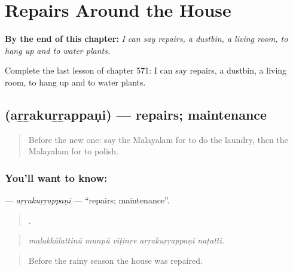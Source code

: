 
\chapter{Repairs Around the House}
\label{ch:ml-repairs-around-the-house}

\begin{chapteropening}
\textbf{By the end of this chapter:} \emph{I can say repairs, a dustbin, a living room, to hang up and to water plants.}

Complete the last lesson of chapter 571: I can say repairs, a dustbin, a living room, to hang up and to water plants.
\end{chapteropening}

\section[\texorpdfstring{\ml{അറ്റകുറ്റപ്പണി} (aṟṟakuṟṟappaṇi)}{അറ്റകുറ്റപ്പണി (aṟṟakuṟṟappaṇi)}]{ (aṟṟakuṟṟappaṇi) — repairs; maintenance}

\label{lesson:ML-C571-arrakurrappani}



\begin{quote}
Before the new one: say the Malayalam for to do the laundry, then the Malayalam for to polish.
\end{quote}

\subsection*{You'll want to know: }
\textbf{} — \emph{aṟṟakuṟṟappaṇi} — \textquotedblleft{}repairs; maintenance\textquotedblright{}.

\begin{quote}
    .
\end{quote}

\begin{quote}
\emph{maḻakkālattinŭ munpŭ vīṭinṟe aṟṟakuṟṟappaṇi naṭatti.}
\end{quote}

\begin{quote}
Before the rainy season the house was repaired.
\end{quote}

